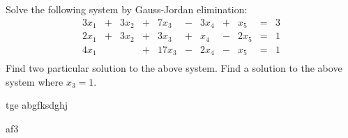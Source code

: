 \begin{Exercise}[name={},
title={}, 
origin={\small by Y. Lamontagne},
counter=Exercise]
\Question Solve the following system by Gauss-Jordan elimination:
\[
\begin{array}{ccccccccccccccc}
3x_1 & + & 3x_2 & + & 7x_3 & - & 3x_4 & + & x_5  &  = & 3\\
2x_1 & + & 3x_2 & + & 3x_3 & + & x_4  & - & 2x_5 &  = & 1\\
4x_1 &  &  & +  & 17x_3  & - & 2x_4  & - & x_5  &  = & 1\\
\end{array}
\]
\Question Find two particular solution to the above system.
\Question Find a solution to the above system where $x_3=1$.
\end{Exercise}

\begin{Answer}
\Question
tge abgfksdghj


\Question
af3
\end{Answer}

